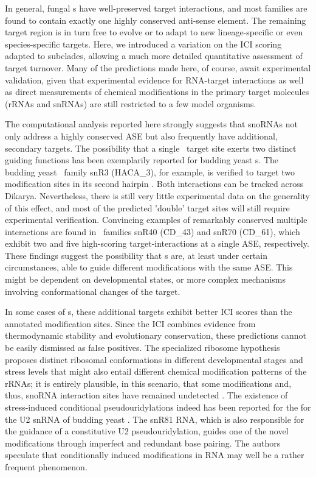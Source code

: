 In general, fungal \sno s have well-preserved target interactions, and
most families are found to contain exactly one highly conserved
anti-sense element. The remaining target region is in turn free to
evolve or to adapt to new lineage-specific or even species-specific
targets. Here, we introduced a variation on the ICI scoring adapted to
subclades, allowing a much more detailed quantitative assessment of
target turnover. Many of the predictions made here, of course, await
experimental validation, given that experimental evidence for
RNA-target interactions as well as direct measurements of chemical
modifications in the primary target molecules (rRNAs and snRNAs) are
still restricted to a few model organisms.

The computational analysis reported here strongly suggests that
snoRNAs not only address a highly conserved ASE but also frequently
have additional, secondary targets. The possibility that a single
\sno\ target site exerts two distinct guiding functions has been exemplarily
reported for budding yeast \haca s. The budding yeast \sno\ family
snR3 (HACA\_3), for example, is verified to target two modification
sites in its second hairpin \cite{Schattner:2004}.  Both interactions
can be tracked across Dikarya.  Nevertheless, there is still very
little experimental data on the generality of this effect, and most of
the predicted 'double' target sites will still require experimental
verification. Convincing examples of remarkably conserved multiple
interactions are found in \cd\ families snR40 (CD\_43) and snR70
(CD\_61), which exhibit two and five high-scoring target-interactions
at a single ASE, respectively.  These findings suggest the possibility
that \sno s are, at least under certain circumstances, able to guide
different modifications with the same ASE. This might be dependent on
developmental states, or more complex mechanisms involving
conformational changes of the target.

In some cases of \haca s, these additional targets exhibit better ICI
scores than the annotated modification sites. Since the ICI combines
evidence from thermodynamic stability and evolutionary conservation, these
predictions cannot be easily dismissed as false positives. The specialized
ribosome hypothesis proposes distinct ribosomal conformations in different
developmental stages and stress levels that might also entail different
chemical modification patterns of the rRNAs; it is entirely plausible, in
this scenario, that some modifications and, thus, snoRNA interaction sites
have remained undetected \citep{Xue:2012}. The existence of
stress-induced conditional pseudouridylations indeed has been reported for
the for the U2 snRNA of budding yeast \cite{Wu:2011}. The snR81 RNA, which
is also responsible for the guidance of a constitutive U2 pseudouridylation,
guides one of the novel modifications through imperfect and redundant base
pairing. The authors speculate that conditionally induced modifications in
RNA may well be a rather frequent phenomenon.


